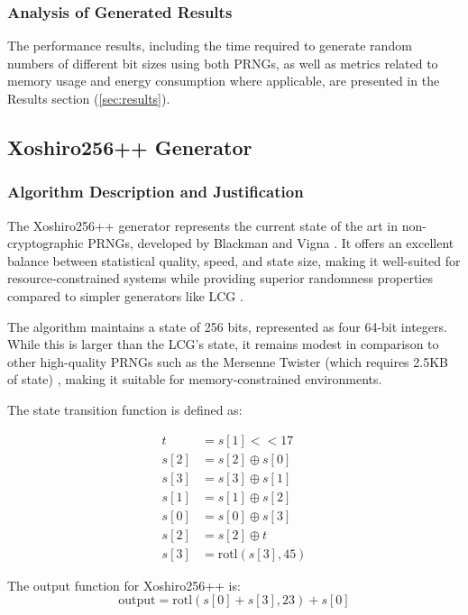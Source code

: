 \subsubsection{Analysis of Generated Results}

The performance results, including the time required to generate random numbers of different bit sizes using both PRNGs, as well as metrics related to memory usage and energy consumption where applicable, are presented in the Results section (\autoref{sec:results}).

\subsection{Xoshiro256++ Generator}

\subsubsection{Algorithm Description and Justification}

The Xoshiro256++ generator represents the current state of the art in non-cryptographic PRNGs, developed by Blackman and Vigna \cite{blackman2019}. It offers an excellent balance between statistical quality, speed, and state size, making it well-suited for resource-constrained systems while providing superior randomness properties compared to simpler generators like LCG \cite{xoshiro_website}.

The algorithm maintains a state of 256 bits, represented as four 64-bit integers. While this is larger than the LCG's state, it remains modest in comparison to other high-quality PRNGs such as the Mersenne Twister (which requires 2.5KB of state) \cite{matsumoto1998}, making it suitable for memory-constrained environments.

The state transition function is defined as:

\begin{align}
t &= s[1] << 17 \\
s[2] &= s[2] \oplus s[0] \\
s[3] &= s[3] \oplus s[1] \\
s[1] &= s[1] \oplus s[2] \\
s[0] &= s[0] \oplus s[3] \\
s[2] &= s[2] \oplus t \\
s[3] &= \text{rotl}(s[3], 45)
\end{align}

The output function for Xoshiro256++ is:
\begin{equation}
\text{output} = \text{rotl}(s[0] + s[3], 23) + s[0]
\end{equation}

